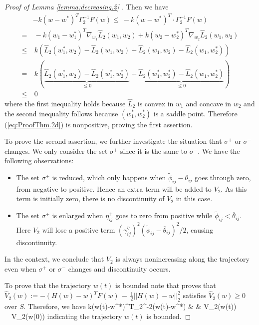 \begin{proof}[Proof of Lemma \ref{lemma:decreasing.2} ]
	\setcounter{equation}{2}
	Then we have
	\begin{align}
	&-k(w-w^*)^T\Gamma_2^{-1} F(w)\le \ -k(w-w^*)^T\cdot \Gamma_2^{-1} F(w) \nonumber \\
	= &\  -k(w_1-w_1^*)^T \nabla_{w_1}\hat L_2(w_1,w_2) + k(w_2-w_2^*)^T \nabla_{w_2}\hat L_2(w_1,w_2) \nonumber \\
	\le & \ k \left(\hat L_2(w_1^*,w_2) - \hat L_2(w_1,w_2) +\hat L_2(w_1,w_2) - \hat L_2(w_1,w^*_2)\right) \nonumber \\
	= &  \ k\left( \underbrace{\hat L_2(w_1^*,w_2) - \hat L_2(w^*_1,w^*_2)}_{\le 0} + \underbrace{\hat L_2(w^*_1,w^*_2) - \hat L_2(w_1,w^*_2)}_{\le 0}\right)\nonumber \\
	\le & \ 0
	\label{saddle point}	
	\end{align}
	where the first inequality holds because $\hat L_2$ is convex in $w_1$ and concave in $w_2$ and the second inequality follows
	because $(w^*_1, w^*_2)$ is a saddle point.    
	Therefore (\ref{eq:ProofThm.2d}) is nonpositive, proving the first assertion. 
	
	To prove the second assertion, we further investigate the situation that $\sigma^+$ or  $\sigma^-$ changes. 
	We only consider the set $\sigma^+$ since it is the same to  $\sigma^-$. We have the following observations:
	\begin{itemize}
		\item The set $\sigma^+$ is reduced, which only happens when $\tilde{\phi}_{ij}-\overline{\theta}_{ij}$ goes through zero, from negative to positive. Hence an extra term will be added to $V_2$. As this term is initially zero, there is no discontinuity of $V_2$ in this case.
		\item The set $\sigma^+$ is enlarged when $\eta_{ij}^+$ goes to zero from positive while $\tilde{\phi}_{ij}<\overline{\theta}_{ij}$. Here $V_2$ will lose a positive term $(\gamma_{ij}^\eta)^2(\tilde{\phi}_{ij}-\overline \theta_{ij})^2/2$, causing discontinuity.
	\end{itemize}
	
	 
	In the context, we conclude that $V_2$ is always nonincreasing along the trajectory even when $\sigma^+$ or $\sigma^-$ changes and discontinuity occurs. 

	To prove that the trajectory $w(t)$ is bounded
	note that \cite[Theorem 3.1]{Fukushima:Equivalent} proves that 
	$\hat V_2(w) := - \left( H(w)-w \right)^T F(w)  \, - \, \frac{1}{2} ||H(w)-w||^2_2$ satisfies
	$\hat V_2(w) \geq 0$ over $S$. 	
	Therefore, we have 
	\bqn
	k(w(t)-w^*)^T\Gamma_2^{-2}(w(t)-w^*) &\!\!\! \le \!\!\! & V_2(w(t)) \ \le \ V_2(w(0))
	\eqn
	indicating the trajectory $w(t)$ is bounded.  
\end{proof}

